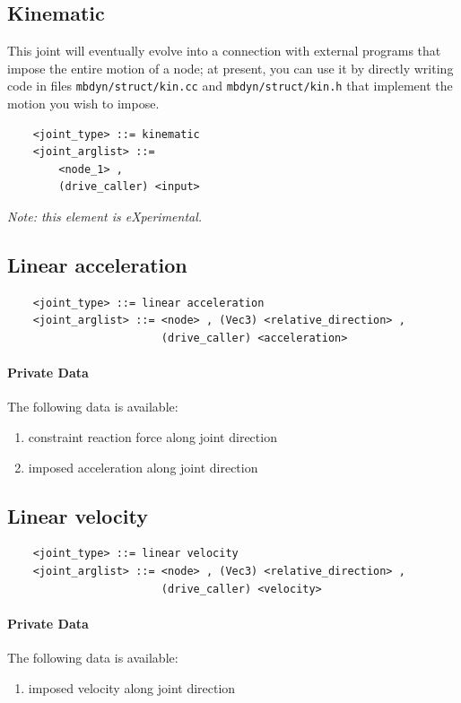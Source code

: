\subsection{Kinematic}
This joint will eventually evolve into a connection with external programs
that impose the entire motion of a node; at present, you can use it
by directly writing code in files \verb;mbdyn/struct/kin.cc; and
\verb;mbdyn/struct/kin.h; that implement the motion you wish to impose.
\begin{verbatim}
    <joint_type> ::= kinematic
    <joint_arglist> ::= 
        <node_1> ,
        (drive_caller) <input>
\end{verbatim}
\emph{Note: this element is eXperimental.}

 \subsection{Linear acceleration}
\begin{verbatim}
    <joint_type> ::= linear acceleration
    <joint_arglist> ::= <node> , (Vec3) <relative_direction> , 
                        (drive_caller) <acceleration>
\end{verbatim}

\paragraph{Private Data}
The following data is available:
\begin{enumerate}
\item {} constraint reaction force along joint direction
\item {} imposed acceleration along joint direction
\end{enumerate}

\subsection{Linear velocity}
\begin{verbatim}
    <joint_type> ::= linear velocity
    <joint_arglist> ::= <node> , (Vec3) <relative_direction> , 
                        (drive_caller) <velocity>
\end{verbatim}

\paragraph{Private Data}
The following data is available:
\begin{enumerate}
\item {} imposed velocity along joint direction
\end{enumerate}

